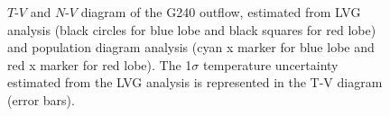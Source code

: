 \begin{figure}[htbp]
\centering
{}
\caption{$T$-$V$ and $N$-$V$ diagram of the G240 outflow, estimated from LVG analysis (black circles for blue lobe and black squares for red lobe) and population diagram analysis (cyan x marker for blue lobe and red x marker for red lobe). The 1$\sigma$ temperature uncertainty estimated from the LVG analysis is represented in the T-V diagram (error bars). \label{fig4}}
\end{figure}


